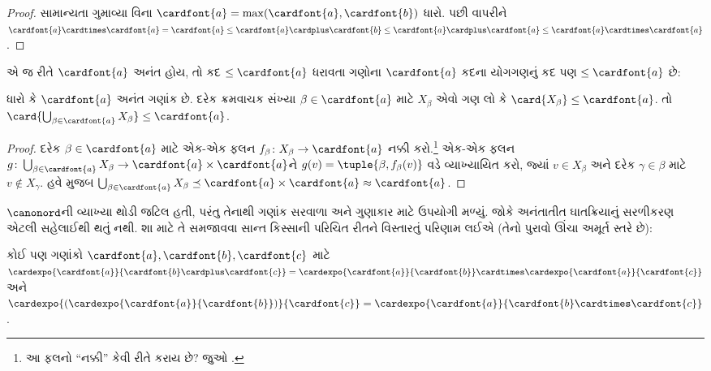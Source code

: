 \begin{proof}
સામાન્યતા ગુમાવ્યા વિના
$\cardfont{a} = \max(\cardfont{a},
\cardfont{b})$ ધારો. પછી 
વાપરીને
$\cardfont{a}\cardtimes\cardfont{a} = \cardfont{a} \leq \cardfont{a}
\cardplus \cardfont{b} \leq \cardfont{a} \cardplus \cardfont{a} \leq
\cardfont{a} \cardtimes \cardfont{a}$.
\end{proof}\noindent એ જ રીતે
$\cardfont{a}$ અનંત હોય, તો કદ
$\leq\cardfont{a}$ ધરાવતા ગણોના $\cardfont{a}$
કદના યોગગણનું કદ પણ $\leq\cardfont{a}$ છે:

\begin{prop}
ધારો કે $\cardfont{a}$ અનંત ગણાંક છે. દરેક
ક્રમવાચક સંખ્યા $\beta \in \cardfont{a}$ માટે
$X_\beta$ એવો ગણ લો કે
$\card{X_\beta} \leq \cardfont{a}$. તો
$\card{\bigcup_{\beta \in \cardfont{a}} X_\beta}
\leq \cardfont{a}$.
\end{prop}

\begin{proof}
દરેક $\beta \in \cardfont{a}$ માટે
એક-એક ફલન $f_\beta \colon X_\beta \to
\cardfont{a}$ નક્કી કરો.\footnote{આ ફલનો
``નક્કી'' કેવી રીતે કરાય છે? જુઓ
.}
એક-એક ફલન $g \colon \bigcup_{\beta \in
\cardfont{a}} X_\beta \to \cardfont{a} \times
\cardfont{a}$ને $g(v) = \tuple{\beta, f_\beta(v)}$
વડે વ્યાખ્યાયિત કરો, જ્યાં $v \in X_\beta$
અને દરેક $\gamma \in \beta$ માટે
$v \notin X_\gamma$. હવે
 મુજબ
$\bigcup_{\beta \in \cardfont{a}} X_\beta \preceq
\cardfont{a} \times \cardfont{a} \approx \cardfont{a}$.
\end{proof}
\endgroup

\begingroup
\makeatletter{}\makeatother


\label{guunit:OLP-0589}


$\canonord$ની વ્યાખ્યા થોડી જટિલ હતી, પરંતુ તેનાથી
ગણાંક સરવાળા અને ગુણાકાર માટે ઉપયોગી
 મળ્યું. જોકે અનંતાતીત
ઘાતક્રિયાનું સરળીકરણ એટલી સહેલાઈથી થતું નથી.
શા માટે તે સમજાવવા સાન્ત કિસ્સાની પરિચિત રીતને
વિસ્તારતું પરિણામ લઈએ (તેનો પુરાવો ઊંચા અમૂર્ત
સ્તરે છે):

\begin{prop}
કોઈ પણ ગણાંકો $\cardfont{a}, \cardfont{b},
\cardfont{c}$ માટે
$\cardexpo{\cardfont{a}}{\cardfont{b} \cardplus \cardfont{c}} =
\cardexpo{\cardfont{a}}{\cardfont{b}} \cardtimes
\cardexpo{\cardfont{a}}{\cardfont{c}}$ અને
$\cardexpo{(\cardexpo{\cardfont{a}}{\cardfont{b}})}{\cardfont{c}} =
\cardexpo{\cardfont{a}}{\cardfont{b} \cardtimes \cardfont{c}}$.
\end{prop}

